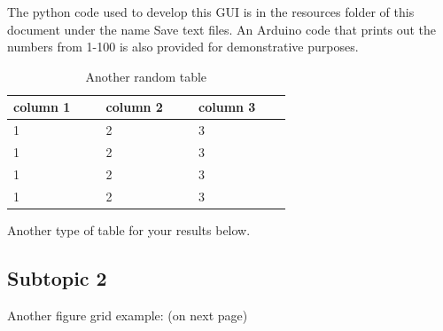 The python code used to develop this GUI is in the resources folder of this document under the name Save text files. An Arduino code that prints out the numbers from 1-100 is also provided for demonstrative purposes.

\begin{table}[ht]
    \centering
    \begin{tabular}{p{0.25\linewidth}p{0.25\linewidth}p{0.25\linewidth}}
    \hline
    column 1 & column 2 & column 3\\
    \hline
    1 & 2 & 3\\
    1 & 2 & 3\\
    1 & 2 & 3\\
    1 & 2 & 3\\
    \hline
    \end{tabular}
    \caption{Another random table}
    \label{tab:2}
\end{table}
\noindent Another type of table for your results below.

\subsection{Subtopic 2}
\lipsum[1]

\noindent Another figure grid example: (on next page)

